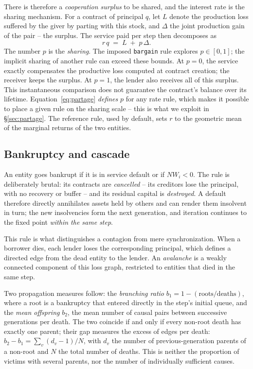 There is therefore a \emph{cooperation surplus} to be shared, and the
interest rate is the sharing mechanism. For a contract of principal
$q$, let $L$ denote the production loss suffered by the giver by
parting with this stock, and $\Delta$ the joint production gain of the
pair -- the surplus. The service paid per step then decomposes as
\begin{equation}
r\,q \;=\; L \;+\; p\,\Delta.
\label{eq:partage}
\end{equation}
The number $p$ is the \emph{sharing}. The imposed \texttt{bargain} rule
explores $p\in[0,1]$; the implicit sharing of another rule can exceed
these bounds. At $p = 0$, the service exactly compensates the
productive loss computed at contract creation; the receiver keeps the
surplus. At $p = 1$, the lender also receives all of this surplus.
This instantaneous comparison does not guarantee the contract's
balance over its lifetime. Equation~\eqref{eq:partage} \emph{defines}
$p$ for any rate rule, which makes it possible to place a given rule on
the sharing scale -- this is what we exploit in
\S\ref{sec:partage}. The reference rule, used by default, sets $r$ to
the geometric mean of the marginal returns of the two entities.

\subsection{Bankruptcy and cascade}
\label{sec:faillite}

An entity goes bankrupt if it is in service default or if $NW_i < 0$.
The rule is deliberately brutal: its contracts are \emph{cancelled} --
its creditors lose the principal, with no recovery or buffer -- and its
residual capital is \emph{destroyed}. A default therefore directly
annihilates assets held by others and can render them insolvent in
turn; the new insolvencies form the next generation, and iteration
continues to the fixed point \emph{within the same step}.

This rule is what distinguishes a contagion from mere synchronization.
When a borrower dies, each lender loses the corresponding principal,
which defines a directed edge from the dead entity to the lender. An
\emph{avalanche} is a weakly connected component of this loss graph,
restricted to entities that died in the same step.


Two propagation measures follow: the \emph{branching ratio}
$b_1 = 1 - (\text{roots}/\text{deaths})$, where a root is a bankruptcy
that entered directly in the step's initial queue, and the \emph{mean
offspring} $b_2$, the mean number of causal pairs between successive
generations per death. The two coincide
if and only if every non-root death has exactly one parent; their gap
measures the excess of edges per death:
$b_2-b_1=\sum_v(d_v-1)/N$,
with $d_v$ the number of previous-generation parents of a non-root and
$N$ the total number of deaths. This is neither the proportion of
victims with several parents, nor the number of individually
sufficient causes.
